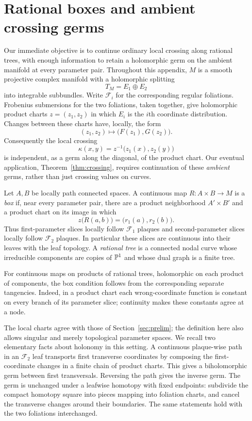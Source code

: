 \section{Rational boxes and ambient crossing germs}\label{app:rational}

Our immediate objective is to continue ordinary local crossing along
rational trees, with enough information to retain a holomorphic germ on
the ambient manifold at every parameter pair. Throughout this appendix,
$M$ is a smooth projective complex manifold with
a holomorphic splitting
\[
T_M=E_1\oplus E_2
\]
into integrable subbundles. Write $\mathcal F_i$ for the corresponding
regular foliations. Frobenius submersions for the two foliations, taken
together, give holomorphic product charts $z=(z_1,z_2)$ in which $E_i$
is the $i$th coordinate distribution. Changes between these charts have,
locally, the form
\[
(z_1,z_2)\longmapsto\bigl(F(z_1),G(z_2)\bigr).
\]
Consequently the local crossing
\begin{equation}\label{rat:local-crossing}
\kappa(x,y)=z^{-1}\bigl(z_1(x),z_2(y)\bigr)
\end{equation}
is independent, as a germ along the diagonal, of the product chart.
Our eventual application, Theorem~\ref{thm:crossing}, requires continuation
of these \emph{ambient} germs, rather than just crossing values on curves.

\begin{definition}\label{rat:definition}
Let $A,B$ be locally path connected spaces. A continuous map
$R:A\times B\to M$ is a \emph{box} if, near every parameter pair, there
are a product neighborhood $A'\times B'$ and a product chart on its
image in which
\[
z\bigl(R(a,b)\bigr)=\bigl(r_1(a),r_2(b)\bigr).
\]
Thus first-parameter slices locally follow $\mathcal F_1$ plaques and
second-parameter slices locally follow $\mathcal F_2$ plaques. In
particular these slices are continuous into their leaves with the leaf
topology. A \emph{rational tree} is a connected nodal curve whose
irreducible components are copies of $\mathbb P^1$ and whose dual graph is a
finite tree.
\end{definition}

For continuous maps on products of rational trees, holomorphic on each
product of components, the box condition follows from the corresponding
separate tangencies. Indeed, in a product chart each wrong-coordinate
function is constant on every branch of its parameter slice; continuity
makes these constants agree at a node.

The local charts agree with those of Section~\ref{sec:prelim}; the
definition here also allows singular and merely topological parameter
spaces. We recall two elementary facts about holonomy in this setting. A
continuous plaque-wise path in an $\mathcal F_2$ leaf transports first
transverse coordinates by composing the first-coordinate changes in a
finite chain of product charts. This gives a biholomorphic germ between
first transversals. Reversing the path gives the inverse germ. The germ
is unchanged under a leafwise homotopy with fixed endpoints: subdivide
the compact homotopy square into pieces mapping into foliation charts,
and cancel the transverse changes around their boundaries. The same
statements hold with the two foliations interchanged.

